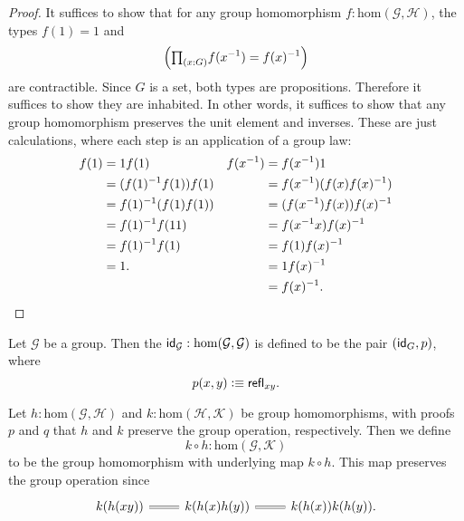 \begin{proof}
It suffices to show that for any group homomorphism $f:\mathrm{hom}(\mathcal{G},\mathcal{H})$, the types $f(1)=1$ and 
\begin{equation*}
\Big(\prd{x:G}f(x^{-1})=f(x)^{-1}\Big)
\end{equation*}
are contractible. Since $G$ is a set, both types are propositions. Therefore it suffices to show they are inhabited. In other words, it suffices to show that any group homomorphism preserves the unit element and inverses. These are just calculations, where each step is an application of a group law:
\begin{align*}
f(1) & = 1f(1)               & f(x^{-1}) & = f(x^{-1})1 \\
     & = (f(1)^{-1}f(1))f(1) &           & = f(x^{-1})(f(x)f(x)^{-1}) \\
     & = f(1)^{-1}(f(1)f(1)) &           & = (f(x^{-1})f(x))f(x)^{-1} \\
     & = f(1)^{-1}f(11)      &           & = f(x^{-1}x)f(x)^{-1} \\
     & = f(1)^{-1}f(1)       &           & = f(1)f(x)^{-1} \\
     & = 1.                  &           & = 1f(x)^{-1} \\
     &                       &           & = f(x)^{-1}.\qedhere
\end{align*}
\end{proof}

\begin{defn}
Let $\mathcal{G}$ be a group. Then the  $\idfunc[\mathcal{G}]:\mathrm{hom}(\mathcal{G},\mathcal{G})$ is defined to be the pair $(\idfunc[G],p)$, where 
\begin{equation*}
p(x,y)\defeq \refl{xy}. 
\end{equation*}
\end{defn}

\begin{defn}
Let $h:\mathrm{hom}(\mathcal{G},\mathcal{H})$ and $k:\mathrm{hom}(\mathcal{H},\mathcal{K})$ be group homomorphisms, with proofs $p$ and $q$ that $h$ and $k$ preserve the group operation, respectively. Then we define
\begin{equation*}
k\circ h:\mathrm{hom}(\mathcal{G},\mathcal{K})
\end{equation*}
to be the group homomorphism with underlying map $k\circ h$. This map preserves the group operation since
\begin{equation*}
\begin{tikzcd}
k(h(xy)) \arrow[r,equals] & k(h(x)h(y)) \arrow[r,equals] & k(h(x))k(h(y)).
\end{tikzcd}
\end{equation*}
\end{defn}

